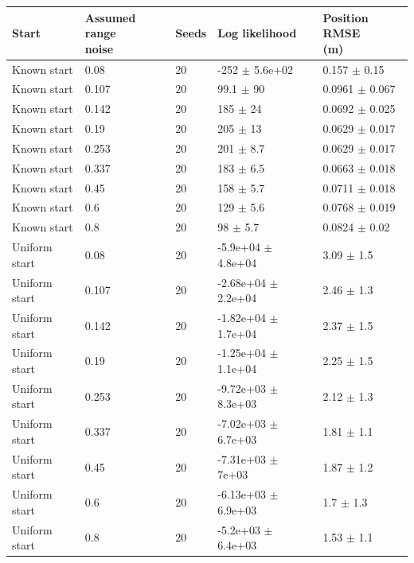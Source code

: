 \begin{tabular}{lllll}
\toprule
Start & \shortstack[l]{Assumed range\\noise} & Seeds & Log likelihood & \shortstack[l]{Position RMSE\\(m)} \\
\midrule
Known start & 0.08 & 20 & -252 $\pm$ 5.6e+02 & 0.157 $\pm$ 0.15 \\
Known start & 0.107 & 20 & 99.1 $\pm$ 90 & 0.0961 $\pm$ 0.067 \\
Known start & 0.142 & 20 & 185 $\pm$ 24 & 0.0692 $\pm$ 0.025 \\
Known start & 0.19 & 20 & 205 $\pm$ 13 & 0.0629 $\pm$ 0.017 \\
Known start & 0.253 & 20 & 201 $\pm$ 8.7 & 0.0629 $\pm$ 0.017 \\
Known start & 0.337 & 20 & 183 $\pm$ 6.5 & 0.0663 $\pm$ 0.018 \\
Known start & 0.45 & 20 & 158 $\pm$ 5.7 & 0.0711 $\pm$ 0.018 \\
Known start & 0.6 & 20 & 129 $\pm$ 5.6 & 0.0768 $\pm$ 0.019 \\
Known start & 0.8 & 20 & 98 $\pm$ 5.7 & 0.0824 $\pm$ 0.02 \\
Uniform start & 0.08 & 20 & -5.9e+04 $\pm$ 4.8e+04 & 3.09 $\pm$ 1.5 \\
Uniform start & 0.107 & 20 & -2.68e+04 $\pm$ 2.2e+04 & 2.46 $\pm$ 1.3 \\
Uniform start & 0.142 & 20 & -1.82e+04 $\pm$ 1.7e+04 & 2.37 $\pm$ 1.5 \\
Uniform start & 0.19 & 20 & -1.25e+04 $\pm$ 1.1e+04 & 2.25 $\pm$ 1.5 \\
Uniform start & 0.253 & 20 & -9.72e+03 $\pm$ 8.3e+03 & 2.12 $\pm$ 1.3 \\
Uniform start & 0.337 & 20 & -7.02e+03 $\pm$ 6.7e+03 & 1.81 $\pm$ 1.1 \\
Uniform start & 0.45 & 20 & -7.31e+03 $\pm$ 7e+03 & 1.87 $\pm$ 1.2 \\
Uniform start & 0.6 & 20 & -6.13e+03 $\pm$ 6.9e+03 & 1.7 $\pm$ 1.3 \\
Uniform start & 0.8 & 20 & -5.2e+03 $\pm$ 6.4e+03 & 1.53 $\pm$ 1.1 \\
\bottomrule
\end{tabular}
